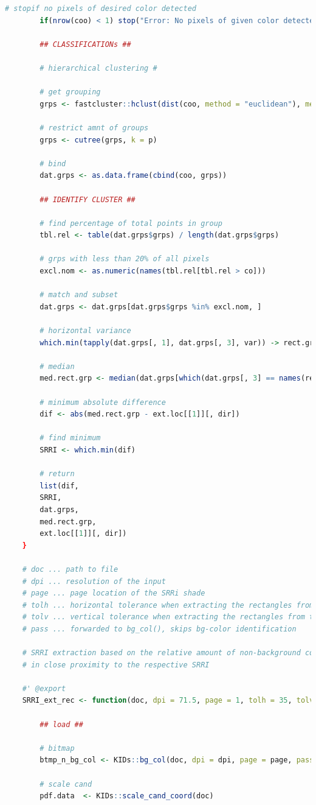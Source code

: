 \documentclass[aodsor,preprint]{imsart}
\numberwithin{equation}{section}
\theoremstyle{plain}
\begin{document}
\begin{lstlisting}[language = R, basicstyle = \tiny]
		# stopif no pixels of desired color detected
		if(nrow(coo) < 1) stop("Error: No pixels of given color detected.")
		
		## CLASSIFICATIONs ##
		
		# hierarchical clustering #
		
		# get grouping
		grps <- fastcluster::hclust(dist(coo, method = "euclidean"), method = method)
		
		# restrict amnt of groups
		grps <- cutree(grps, k = p)
		
		# bind
		dat.grps <- as.data.frame(cbind(coo, grps))
		
		## IDENTIFY CLUSTER ##
		
		# find percentage of total points in group
		tbl.rel <- table(dat.grps$grps) / length(dat.grps$grps)
		
		# grps with less than 20% of all pixels
		excl.nom <- as.numeric(names(tbl.rel[tbl.rel > co]))
		
		# match and subset
		dat.grps <- dat.grps[dat.grps$grps %in% excl.nom, ]
		
		# horizontal variance
		which.min(tapply(dat.grps[, 1], dat.grps[, 3], var)) -> rect.grp
		
		# median
		med.rect.grp <- median(dat.grps[which(dat.grps[, 3] == names(rect.grp)), 1])
		
		# minimum absolute difference
		dif <- abs(med.rect.grp - ext.loc[[1]][, dir])
		
		# find minimum
		SRRI <- which.min(dif)
		
		# return
		list(dif,
		SRRI,
		dat.grps,
		med.rect.grp,
		ext.loc[[1]][, dir])
	}
	
	# doc ... path to file
	# dpi ... resolution of the input
	# page ... page location of the SRRi shade
	# tolh ... horizontal tolerance when extracting the rectangles from the SRRI scale
	# tolv ... vertical tolerance when extracting the rectangles from the SRRI scale
	# pass ... forwarded to bg_col(), skips bg-color identification
	
	# SRRI extraction based on the relative amount of non-background colored pixels
	# in close proximity to the respective SRRI
	
	#' @export
	SRRI_ext_rec <- function(doc, dpi = 71.5, page = 1, tolh = 35, tolv = 10.5, pass = FALSE){
		
		## load ##
		
		# bitmap
		btmp_n_bg_col <- KIDs::bg_col(doc, dpi = dpi, page = page, pass = pass)
		
		# scale cand
		pdf.data  <- KIDs::scale_cand_coord(doc)
		

\end{lstlisting}
\end{document}
